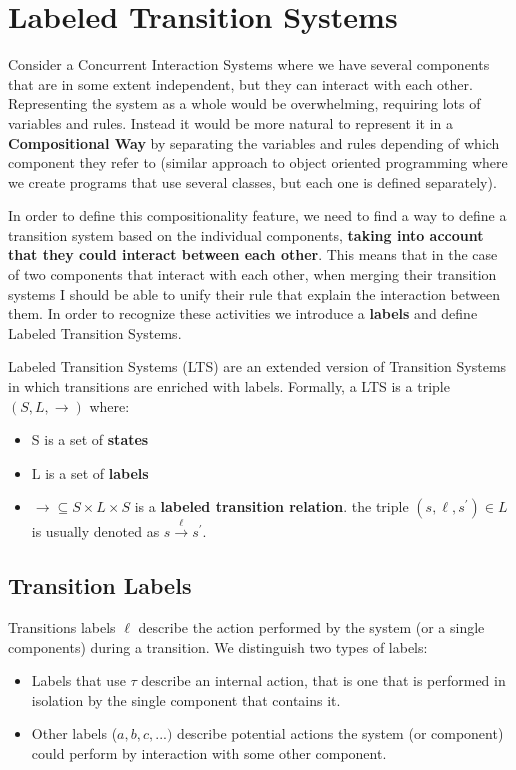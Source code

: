 \section{Labeled Transition Systems}
Consider a Concurrent Interaction Systems where we have several components that are in some extent independent, but they can interact with each other. Representing the system as a whole would be overwhelming, requiring lots of variables and rules. Instead it would be more natural to represent it in a \textbf{Compositional Way} by separating the variables and rules depending of which component they refer to (similar approach to object oriented programming where we create programs that use several classes, but each one is defined separately).\par
In order to define this compositionality feature, we need to find a way to define a transition system based on the individual components, \textbf{taking into account that they could interact between each other}. This means that in the case of two components that interact with each other, when merging their transition systems I should be able to unify their rule that explain the interaction between them. In order to recognize these activities we introduce a \textbf{labels} and define Labeled Transition Systems.\par
Labeled Transition Systems (LTS) are an extended version of Transition Systems in which transitions are enriched with labels. Formally, a LTS is a triple $(S, L, \rightarrow)$ where:
\begin{itemize}
    \item S is a set of \textbf{states}
    \item L is a set of \textbf{labels}
    \item $\rightarrow \subseteq S \times L \times S$ is a \textbf{labeled transition relation}. the triple $(s, \ell, s^{'}) \in L$ is usually denoted as $s \xrightarrow{\ell} s^{'}$. 
\end{itemize}

\subsection{Transition Labels}
Transitions labels $\ell$ describe the action performed by the system (or a single components) during a transition. We distinguish two types of labels:

\begin{itemize}
    \item Labels that use $\tau$ describe an internal action, that is one that is performed in isolation by the single component that contains it.
    \item Other labels ($a, b, c, ...)$ describe potential actions the system (or component) could perform by interaction with some other component.
\end{itemize}

